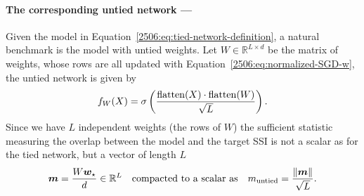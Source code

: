 \paragraph{The corresponding untied network ---} Given the model in Equation~\eqref{2506:eq:tied-network-definition}, a natural benchmark is the model with untied weights. Let \(W \in \mathbb{R}^{L\times d}\) be the matrix of weights, whose rows are all updated with Equation~\eqref{2506:eq:normalized-SGD-w}, the untied network is given by
\begin{equation} \label{2506:eq:untied-network-definition}
    f_{W}(X) = \sigma\left(\frac{\operatorname{flatten}(X)\cdot \operatorname{flatten}(W)}{\sqrt{L}}\right).
\end{equation}
Since we have \(L\) independent weights (the rows of \(W\)) the sufficient statistic measuring the overlap between the model and the target SSI is not a scalar as for the tied network, but a vector of length \(L\)
\begin{equation}
    {\boldsymbol{m}} = \frac{W{\boldsymbol{w}}_\star}{d} \in \mathbb{R}^L \quad\text{compacted to a scalar as}\quad m_\mathrm{untied} = \frac{\left\lVert {\boldsymbol{m}}\right\rVert }{\sqrt{L}}.
\end{equation}

